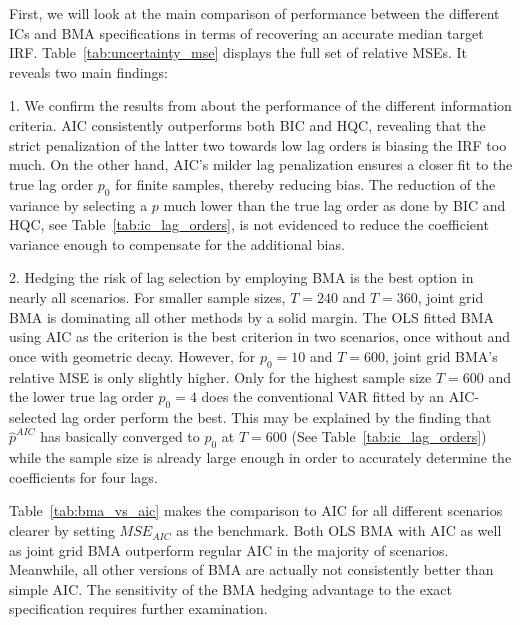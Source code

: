 \documentclass[12pt, a4paper]{article}
\begin{document}




First, we will look at the main comparison of performance between the different ICs and BMA specifications in terms of recovering an accurate median target IRF. Table~\ref{tab:uncertainty_mse} displays the full set of relative MSEs. It reveals two main findings:

1. We confirm the results from \citet{ivanovPractitionersGuideLag2005} about the performance of the different information criteria. AIC consistently outperforms both BIC and HQC, revealing that the strict penalization of the latter two towards low lag orders is biasing the IRF too much. On the other hand, AIC's milder lag penalization ensures a closer fit to the true lag order $p_0$ for finite samples, thereby reducing bias. The reduction of the variance by selecting a $p$ much lower than the true lag order as done by BIC and HQC, see Table~\ref{tab:ic_lag_orders}, is not evidenced to reduce the coefficient variance enough to compensate for the additional bias.

2. Hedging the risk of lag selection by employing BMA is the best option in nearly all scenarios. For smaller sample sizes, $T=240$ and $T=360$, joint grid BMA is dominating all other methods by a solid margin. The OLS fitted BMA using AIC as the criterion is the best criterion in two scenarios, once without and once with geometric decay. However, for $p_0=10$ and $T=600$, joint grid BMA's relative MSE is only slightly higher. Only for the highest sample size $T=600$ and the lower true lag order $p_0=4$ does the conventional VAR fitted by an AIC-selected lag order perform the best. This may be explained by the finding that $\hat p^{AIC}$ has basically converged to $p_0$ at $T=600$ (See Table~\ref{tab:ic_lag_orders}) while the sample size is already large enough in order to accurately determine the coefficients for four lags. 

Table~\ref{tab:bma_vs_aic} makes the comparison to AIC for all different scenarios clearer by setting $MSE_{AIC}$ as the benchmark. Both OLS BMA with AIC as well as joint grid BMA outperform regular AIC in the majority of scenarios. Meanwhile, all other versions of BMA are actually not consistently better than simple AIC. The sensitivity of the BMA hedging advantage to the exact specification requires further examination.
\end{document}
